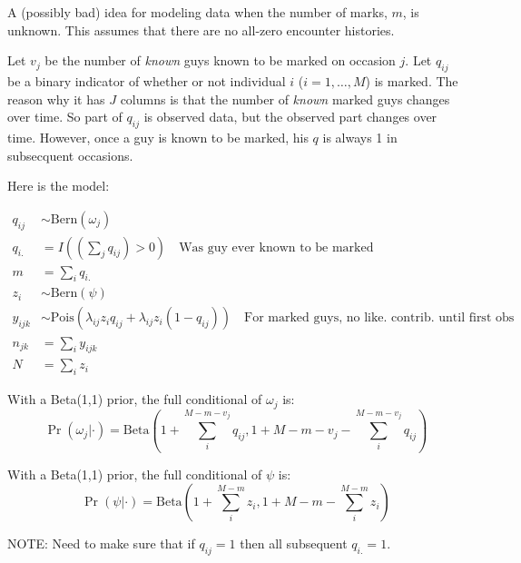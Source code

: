 \documentclass[12pt]{article}
\begin{document}
A (possibly bad) idea for modeling data when the number of marks, $m$, is
unknown. This assumes that there are no all-zero encounter histories.

Let $v_j$ be the number of \textit{known} guys known to be marked on
occasion $j$. Let $q_{ij}$ be a binary indicator of whether or not individual $i$
($i=1,\ldots,M$) is marked. The reason why it has $J$ columns is that
the number of \textit{known} marked guys changes over time. So part of
$q_{ij}$ is observed data, but the observed part changes over time.
However, once a
guy is known to be marked, his $q$ is always 1 in subsecquent occasions.

Here is the model:

\begin{align*}
q_{ij} &\sim \text{Bern}(\omega_j) \\
q_{i.} &= I((\sum_j q_{ij})>0) \quad \text{Was guy ever known to be marked}\\
m &= \sum_i q_{i.} \\
z_i &\sim \text{Bern}(\psi) \\
y_{ijk} &\sim
\text{Pois}(\lambda_{ij}z_{i}q_{ij} + \lambda_{ij}z_i(1-q_{ij})) \quad
\text{For marked guys, no like. contrib. until first obs}\\
n_{jk} &= \sum_i y_{ijk} \\
N &= \sum_i z_i
\end{align*}

With a Beta(1,1) prior, the full conditional of $\omega_j$ is:
\[
\Pr(\omega_j|\cdot) = \text{Beta}(1+\sum_i^{M-m-v_j} q_{ij}, 1+M-m-v_j-\sum_i^{M-m-v_j}q_{ij})
\]

With a Beta(1,1) prior, the full conditional of $\psi$ is:
\[
\Pr(\psi|\cdot) = \text{Beta}(1+\sum_i^{M-m} z_{i}, 1+M-m-\sum_i^{M-m}z_i)
\]

NOTE: Need to make sure that if $q_{ij}=1$ then all subsequent
$q_{i.}=1$.
\end{document}
